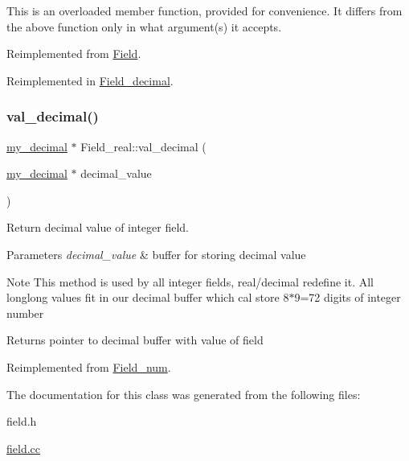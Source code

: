 This is an overloaded member function, provided for convenience. It differs from the above function only in what argument(s) it accepts.

Reimplemented from \mbox{\hyperlink{classField_a42f448ff2c939d91949f7635d939b16b}{Field}}.



Reimplemented in \mbox{\hyperlink{classField__decimal_a175db70d41ae30df50a1ec04d8680363}{Field\+\_\+decimal}}.

\mbox{\label{classField__real_aea0b139caebcb6dc909b1bc397f5aba6}} 
\subsubsection{\texorpdfstring{val\+\_\+decimal()}{val\_decimal()}}
{\footnotesize\ttfamily \mbox{\hyperlink{classmy__decimal}{my\+\_\+decimal}} $\ast$ Field\+\_\+real\+::val\+\_\+decimal (\begin{DoxyParamCaption}\item[{\mbox{\hyperlink{classmy__decimal}{my\+\_\+decimal}} $\ast$}]{decimal\+\_\+value }\end{DoxyParamCaption})\hspace{0.3cm}{\ttfamily [virtual]}}

Return decimal value of integer field.


\begin{DoxyParams}{Parameters}
{\em decimal\+\_\+value} & buffer for storing decimal value\\
\hline
\end{DoxyParams}
\begin{DoxyNote}{Note}
This method is used by all integer fields, real/decimal redefine it. All longlong values fit in our decimal buffer which cal store 8$\ast$9=72 digits of integer number
\end{DoxyNote}
\begin{DoxyReturn}{Returns}
pointer to decimal buffer with value of field 
\end{DoxyReturn}


Reimplemented from \mbox{\hyperlink{classField__num_a6fec8b8c9fc5c0b9b0429f6fbc860de3}{Field\+\_\+num}}.



The documentation for this class was generated from the following files\+:\begin{DoxyCompactItemize}
\item 
field.\+h\item 
\mbox{\hyperlink{field_8cc}{field.\+cc}}\end{DoxyCompactItemize}
